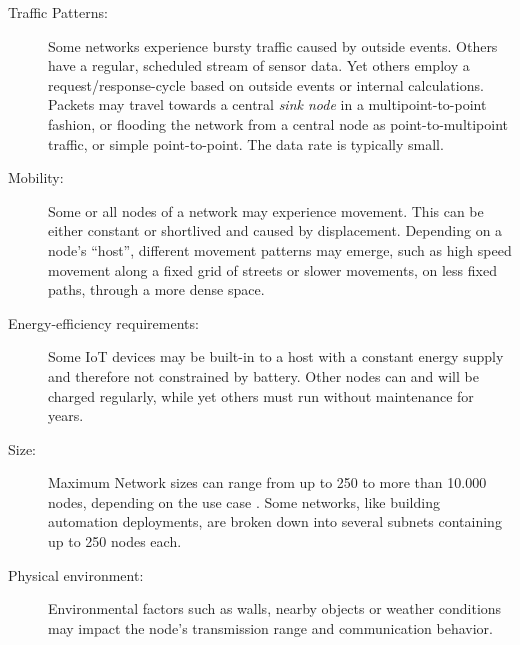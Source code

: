 \documentclass{acm_proc_article-sp}
\begin{document}
\begin{description}
\item[Traffic Patterns:] Some networks experience bursty traffic caused by outside events. Others have a regular, scheduled stream of sensor data. Yet others employ a request/response-cycle based on outside events or internal calculations. Packets may travel towards a central \emph{sink node} in a multipoint-to-point fashion, or flooding the network from a central node as point-to-multipoint traffic, or simple point-to-point. The data rate is typically small.
\item[Mobility:] Some or all nodes of a network may experience movement. This can be either constant or shortlived and caused by displacement. Depending on a node's ``host'', different movement patterns may emerge, such as high speed movement along a fixed grid of streets or slower movements, on less fixed paths, through a more dense space.
\item[Energy-efficiency requirements:] Some IoT devices may be built-in to a host with a constant energy supply and therefore not constrained by battery. Other nodes can and will be charged regularly, while yet others must run without maintenance for years.
\item[Size:] Maximum Network sizes can range from up to 250 to more than 10.000 nodes, depending on the use case \cite{RFC-5826} \cite{RFC-5867} \cite{RFC-5548}. Some networks, like building automation deployments, are broken down into several subnets containing up to 250 nodes each.
\item[Physical environment:] Environmental factors such as walls, nearby objects or weather conditions may impact the node's transmission range \cite{food_monitoring} and communication behavior.
\end{description}
\end{document}
